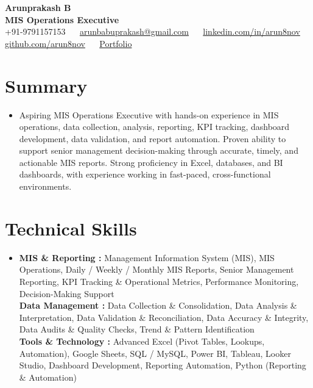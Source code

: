 \documentclass[letterpaper,10pt]{article}
\begin{document}
\begin{center}
  {\huge\textbf{Arunprakash B}}\\[4pt]
  {\large\color{airforceblue}\textbf{MIS Operations Executive}}\\[5pt]
  \small
  +91-9791157153 ~\textbar~
  \href{mailto:arunbabuprakash@gmail.com}{arunbabuprakash@gmail.com} ~\textbar~
  \href{https://www.linkedin.com/in/arun8nov}{linkedin.com/in/arun8nov} ~\textbar~
  \href{https://github.com/arun8nov}{github.com/arun8nov} ~\textbar~
  \href{https://arun8nov.notion.site/Hey-there-I-am-Arunprakash-B-223fe4a17f8a80faa5abee1f246a06f1}{Portfolio}
\end{center}
\vspace{-10pt}

\section{Summary}
\begin{itemize}[leftmargin=0in, label={}]
  \item\normalsize{
    Aspiring MIS Operations Executive with hands-on experience in MIS operations, data collection, analysis, reporting, KPI tracking, dashboard development, data validation, and report automation. Proven ability to support senior management decision-making through accurate, timely, and actionable MIS reports. Strong proficiency in Excel, databases, and BI dashboards, with experience working in fast-paced, cross-functional environments.
  }
\end{itemize}
\vspace{-14pt}

\section{Technical Skills}
\begin{itemize}[leftmargin=0in, label={}]
  \small\item{
    \textbf{MIS \& Reporting :} Management Information System (MIS), MIS Operations, Daily / Weekly / Monthly MIS Reports, Senior Management Reporting, KPI Tracking \& Operational Metrics, Performance Monitoring, Decision-Making Support \\
    \textbf{Data Management :} Data Collection \& Consolidation, Data Analysis \& Interpretation, Data Validation \& Reconciliation, Data Accuracy \& Integrity, Data Audits \& Quality Checks, Trend \& Pattern Identification \\
    \textbf{Tools \& Technology :} Advanced Excel (Pivot Tables, Lookups, Automation), Google Sheets, SQL / MySQL, Power BI, Tableau, Looker Studio, Dashboard Development, Reporting Automation, Python (Reporting \& Automation)
  }
\end{itemize}
\vspace{-14pt}
\end{document}
